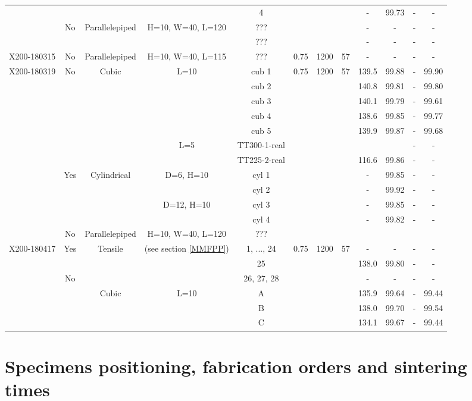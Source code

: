 \begin{center}
\begin{landscape}
\begin{savenotes}
\begin{longtable}{@{\extracolsep{\fill}}*{12}{|c}|@{}}
    & & & &4 & & & &- &99.73 &- &-\\
    & No & Parallelepiped & H=10, W=40, L=120 & ??? & & & &- &- &- &-\\
        &  & & & ??? & & & &- &- &- &-\\
\hline  
  X200-180315 & No & Parallelepiped & H=10, W=40, L=115& ??? & 0.75 & 1200 &57 &- &- &- &-\\
  \hline
  X200-180319  & No & Cubic & L=10 & cub 1 & 0.75 & 1200 &57 &139.5 & 99.88&- &99.90\\
  & &  & & cub 2 & & & &140.8 &99.81 &- &99.80\\
  & &  & & cub 3 & & & &140.1 &99.79 &- &99.61\\
  & & & & cub 4 & & & &138.6 &99.85 &- &99.77\\
  & & & & cub 5 & & & &139.9 &99.87 &- &99.68\\
  & & &  L=5& TT300-1-real &  & & & & &- &-\\
  & &  & & TT225-2-real &  & & &116.6 & 99.86 &- &-\\
  & Yes &  Cylindrical & D=6, H=10&cyl 1   &  & & &- &99.85 &- &-\\
    & &  & &cyl 2 & & & & -&99.92 &- &-\\
    & &  & D=12, H=10 &cyl 3 & & & &- &99.85 &- &-\\
    & &  &  &cyl 4  & & & &- &99.82 &- &-\\
 & No & Parallelepiped & H=10, W=40, L=120 & ??? & & & & & & &\\ 
    \hline 
X200-180417 & Yes & Tensile & (see section \ref{MMFPP}) & 1, ..., 24 & 0.75 &1200 &57 & -& -& -&-\\
& &  & & 25 & && &138.0 &99.80 &- &-\\
& No &  & & 26, 27, 28 & && &- &- &- &-\\
&  & Cubic & L=10 & A & & & &135.9 &99.64 &- &99.44\\
&  & & & B & && &138.0 & 99.70& -&99.54\\
&  & & & C & && & 134.1&99.67 &- &99.44\\
\end{longtable}
\end{savenotes}
\end{landscape}
 \end{center}

\section{Specimens positioning, fabrication orders and sintering times}
\label{mda}
